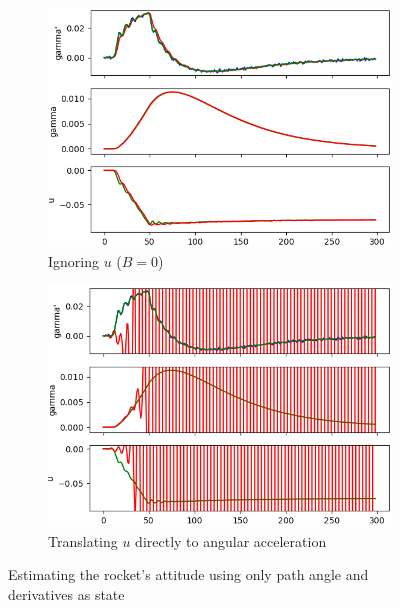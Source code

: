 \documentclass[a4paper]{article}
\begin{document}
\begin{figure}[t]
\centering
\begin{subfigure}[t]{0.48\textwidth}
\centering
\includegraphics[width=\textwidth]{kalman_attitude_B0.png}
\caption{Ignoring $u$ ($B=0$)} \label{fig:simple_attitude_B0}
\end{subfigure}
\begin{subfigure}[t]{0.48\textwidth}
\centering
\includegraphics[width=\textwidth]{kalman_attitude_Bdirect.png} 
\caption{Translating $u$ directly to angular acceleration} \label{fig:simple_attitude_Bdirect}
\end{subfigure}
\caption{Estimating the rocket's attitude using only path angle and derivatives as state} \label{fig:simple_attitude}
\end{figure}
\end{document}
